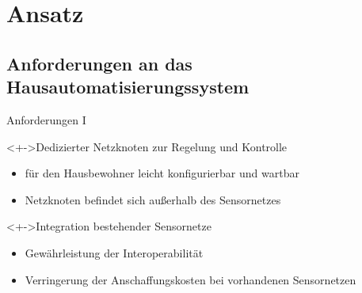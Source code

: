 \section[Ansatz]{Ansatz}
\myContentSectionFrame[\thesection - 6]


\subsection[Anforderungen]{Anforderungen an das Hausautomatisierungssystem}


\begin{frame}{\insertsection}{Anforderungen I}
	\begin{block}<+->{Dedizierter Netzknoten zur Regelung und Kontrolle}
		\begin{itemize}
		\item 	für den Hausbewohner leicht konfigurierbar und wartbar
		\item 	Netzknoten befindet sich außerhalb des Sensornetzes
		\end{itemize}
	\end{block}
	\vfill
	\begin{block}<+->{Integration bestehender Sensornetze}
		\begin{itemize}
		\item 	Gewährleistung der Interoperabilität
		\item 	Verringerung der Anschaffungskosten bei vorhandenen Sensornetzen
		\end{itemize}
	\end{block}
\end{frame}


